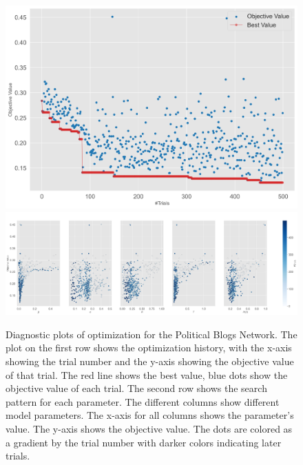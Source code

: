 \documentclass[11pt]{article}
\begin{document}
\begin{figure}[H]
    \centering
    \includegraphics[width=.7\linewidth]{../plots/overall/Optimization_History_polblogs.png}
    \includegraphics[width=.7\linewidth]{../plots/overall/Plot_Slice_polblogs.png}
  \caption{Diagnostic plots of optimization for the Political Blogs Network. The plot on the first row shows the optimization history, with the x-axis showing the trial number and the y-axis showing the objective value of that trial. The red line shows the best value, blue dots show the objective value of each trial. The second row shows the search pattern for each parameter. The different columns show different model parameters. The x-axis for all columns shows the parameter's value. The y-axis shows the objective value. The dots are colored as a gradient by the trial number with darker colors indicating later trials.}
  \label{appendix:optimization_polblogs}
\end{figure}
\end{document}
